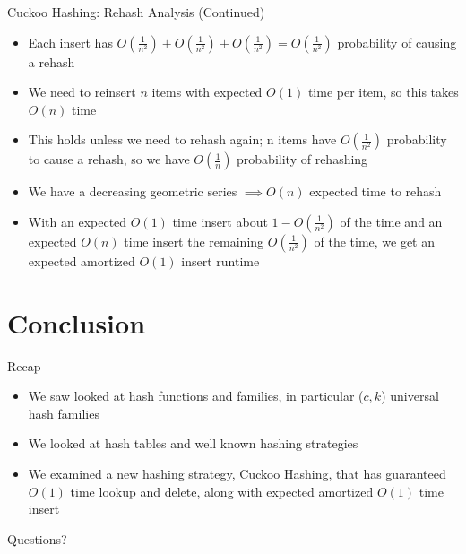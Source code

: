 \documentclass[aspectratio=169]{beamer}
\begin{document}
\begin{frame}{Cuckoo Hashing: Rehash Analysis (Continued)}
    \begin{itemize}
        \item Each insert has $O(\frac 1 {n^2}) + O(\frac 1 {n^2}) + O(\frac 1 {n^2}) = O(\frac 1 {n^2})$ probability of causing a rehash
        \item We need to reinsert $n$ items with expected $O(1)$ time per item, so this takes $O(n)$ time \pause
        \item This holds unless we need to rehash again; n items have $O(\frac 1 {n^2})$ probability to cause a rehash, so we have $O(\frac 1 n)$ probability of rehashing
        \item We have a decreasing geometric series $\implies O(n)$ expected time to rehash \pause
        \item With an expected $O(1)$ time insert about $1 - O(\frac 1 {n^2})$ of the time and an expected $O(n)$ time insert the remaining $O(\frac 1 {n^2})$ of the time, we get an expected amortized $O(1)$ insert runtime
    \end{itemize}
\end{frame}

\section{Conclusion}
\frame{\sectionpage}

\begin{frame}{Recap}
    \begin{itemize}
        \item We saw looked at hash functions and families, in particular ($c, k$) universal hash families
        \item We looked at hash tables and well known hashing strategies
        \item We examined a new hashing strategy, Cuckoo Hashing, that has guaranteed $O(1)$ time lookup and delete, along with expected amortized $O(1)$ time insert
    \end{itemize}
\end{frame}

\begin{frame}{}
      \begin{center}
    {\color{sigma@mainblue} \LARGE Questions?}
  \end{center}
\end{frame}
\end{document}
